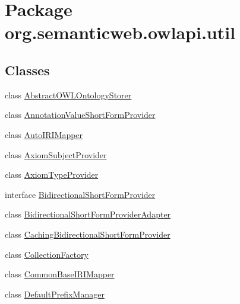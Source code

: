 \hypertarget{namespaceorg_1_1semanticweb_1_1owlapi_1_1util}{\section{Package org.\-semanticweb.\-owlapi.\-util}
\label{namespaceorg_1_1semanticweb_1_1owlapi_1_1util}
}
\subsection*{Classes}
\begin{DoxyCompactItemize}
\item 
class \hyperlink{classorg_1_1semanticweb_1_1owlapi_1_1util_1_1_abstract_o_w_l_ontology_storer}{Abstract\-O\-W\-L\-Ontology\-Storer}
\item 
class \hyperlink{classorg_1_1semanticweb_1_1owlapi_1_1util_1_1_annotation_value_short_form_provider}{Annotation\-Value\-Short\-Form\-Provider}
\item 
class \hyperlink{classorg_1_1semanticweb_1_1owlapi_1_1util_1_1_auto_i_r_i_mapper}{Auto\-I\-R\-I\-Mapper}
\item 
class \hyperlink{classorg_1_1semanticweb_1_1owlapi_1_1util_1_1_axiom_subject_provider}{Axiom\-Subject\-Provider}
\item 
class \hyperlink{classorg_1_1semanticweb_1_1owlapi_1_1util_1_1_axiom_type_provider}{Axiom\-Type\-Provider}
\item 
interface \hyperlink{interfaceorg_1_1semanticweb_1_1owlapi_1_1util_1_1_bidirectional_short_form_provider}{Bidirectional\-Short\-Form\-Provider}
\item 
class \hyperlink{classorg_1_1semanticweb_1_1owlapi_1_1util_1_1_bidirectional_short_form_provider_adapter}{Bidirectional\-Short\-Form\-Provider\-Adapter}
\item 
class \hyperlink{classorg_1_1semanticweb_1_1owlapi_1_1util_1_1_caching_bidirectional_short_form_provider}{Caching\-Bidirectional\-Short\-Form\-Provider}
\item 
class \hyperlink{classorg_1_1semanticweb_1_1owlapi_1_1util_1_1_collection_factory}{Collection\-Factory}
\item 
class \hyperlink{classorg_1_1semanticweb_1_1owlapi_1_1util_1_1_common_base_i_r_i_mapper}{Common\-Base\-I\-R\-I\-Mapper}
\item 
class \hyperlink{classorg_1_1semanticweb_1_1owlapi_1_1util_1_1_default_prefix_manager}{Default\-Prefix\-Manager}
\item 

\end{DoxyCompactItemize}
